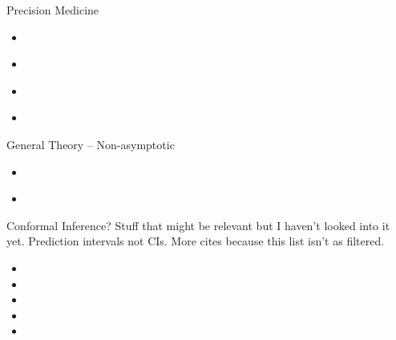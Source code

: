 \documentclass[aspectratio=169, professionalfonts]{beamer}
\begin{document}
\begin{frame}{Precision Medicine}
	\vfill
	\begin{itemize}
		\item \cite{laber2014Dynamic}
		      \vfill

		\item 	\cite{luedtke2016Statistical}
		      \vfill

		\item 	\cite{shi2022Statistical}

		\item \cite{hadad2021Confidence}
	\end{itemize}
	\vfill

\end{frame}

\begin{frame}{General Theory -- Non-asymptotic}
	\vfill
	\begin{itemize}
		\item \cite{waudby-smith2022Anytimevalid}
		      \vfill

		      \item\cite{howard2021Timeuniform}
	\end{itemize}
	\vfill

	\begin{frame}{Conformal Inference?}
		Stuff that might be relevant but I haven't looked into it yet.
		Prediction intervals not CIs. More cites because this list isn't
		as filtered.
		\begin{itemize}
			\item {}
			      \vfill
			\item {}
			      \vfill
			\item {}
			      \vfill
			\item {}
			      \vfill
			\item {}
			      \vfill
		\end{itemize}
	\end{frame}

\end{frame}

\appendix
\printbibliography
\end{document}
